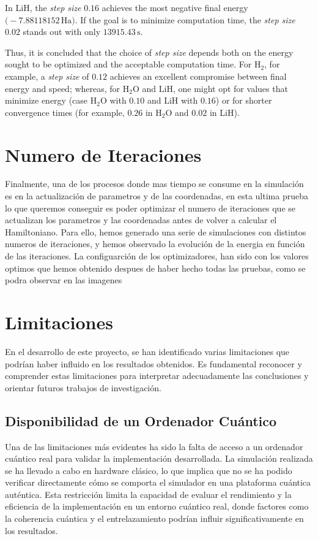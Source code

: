 In \(\mathrm{LiH}\), the \textit{step size} \(0.16\) achieves the most negative final energy \(\bigl(-7.88118152\,\mathrm{Ha}\bigr)\). If the goal is to minimize computation time, the \textit{step size} \(0.02\) stands out with only \(13915.43\,\mathrm{s}\).

Thus, it is concluded that the choice of \textit{step size} depends both on the energy sought to be optimized and the acceptable computation time. For \(\mathrm{H_2}\), for example, a \textit{step size} of \(0.12\) achieves an excellent compromise between final energy and speed; whereas, for \(\mathrm{H_2O}\) and \(\mathrm{LiH}\), one might opt for values that minimize energy (case \(\mathrm{H_2O}\) with \(0.10\) and \(\mathrm{LiH}\) with \(0.16\)) or for shorter convergence times (for example, \(0.26\) in \(\mathrm{H_2O}\) and \(0.02\) in \(\mathrm{LiH}\)).

\section{Numero de Iteraciones}

Finalmente, una de los procesos donde mas tiempo se consume en la simulación es en la actualización de parametros y de las coordenadas, en esta ultima prueba lo que queremos conseguir es poder optimizar el numero de iteraciones que se actualizan los parametros y las coordenadas antes de volver a calcular el Hamiltoniano. Para ello, hemos generado una serie de simulaciones con distintos numeros de iteraciones, y hemos observado la evolución de la energia en función de las iteraciones. La configuarción de los optimizadores, han sido con los valores optimos que hemos obtenido despues de haber hecho todas las pruebas, como se podra observar en las imagenes


\section{Limitaciones}
En el desarrollo de este proyecto, se han identificado varias limitaciones que podrían haber influido en los resultados obtenidos. Es fundamental reconocer y comprender estas limitaciones para interpretar adecuadamente las conclusiones y orientar futuros trabajos de investigación.

\subsection{Disponibilidad de un Ordenador Cuántico}
Una de las limitaciones más evidentes ha sido la falta de acceso a un ordenador cuántico real para validar la implementación desarrollada. La simulación realizada se ha llevado a cabo en hardware clásico, lo que implica que no se ha podido verificar directamente cómo se comporta el simulador en una plataforma cuántica auténtica. Esta restricción limita la capacidad de evaluar el rendimiento y la eficiencia de la implementación en un entorno cuántico real, donde factores como la coherencia cuántica y el entrelazamiento podrían influir significativamente en los resultados.

